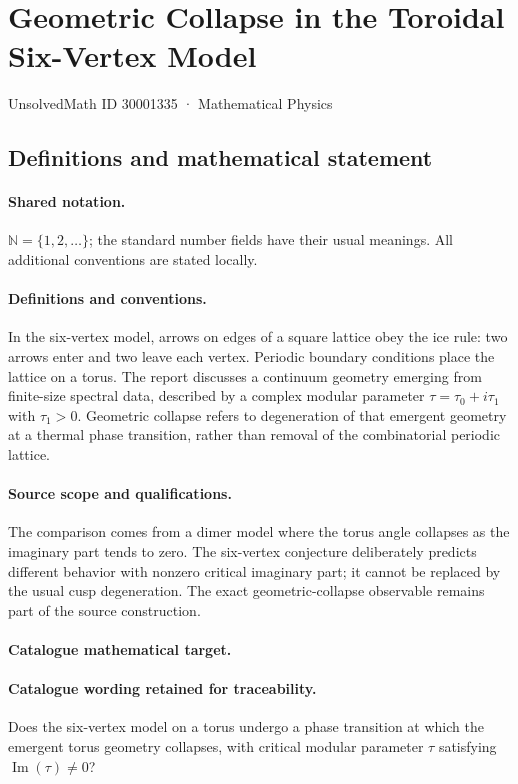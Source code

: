 \documentclass[11pt]{article}
\begin{document}
\setcounter{section}{30001334}
\section{Geometric Collapse in the Toroidal Six-Vertex Model}\label{30001335}
{\small UnsolvedMath ID 30001335 · Mathematical Physics}
\subsection{Definitions and mathematical statement}

\paragraph{Shared notation.}$\mathbb N=\{1,2,\ldots\}$; the standard number fields have their usual meanings. All additional conventions are stated locally.


\paragraph{Definitions and conventions.} In the six-vertex model, arrows on edges of a square lattice obey the ice rule: two arrows enter and two leave each vertex. Periodic boundary conditions place the lattice on a torus. The report discusses a continuum geometry emerging from finite-size spectral data, described by a complex modular parameter $\tau=\tau_0+i\tau_1$ with $\tau_1>0$. Geometric collapse refers to degeneration of that emergent geometry at a thermal phase transition, rather than removal of the combinatorial periodic lattice.

\paragraph{Source scope and qualifications.} The comparison comes from a dimer model where the torus angle collapses as the imaginary part tends to zero. The six-vertex conjecture deliberately predicts different behavior with nonzero critical imaginary part; it cannot be replaced by the usual cusp degeneration. The exact geometric-collapse observable remains part of the source construction.

\paragraph{Catalogue mathematical target.}
\paragraph{Catalogue wording retained for traceability.}
Does the six-vertex model on a torus undergo a phase transition at which the emergent torus geometry collapses, with critical modular parameter $\tau$ satisfying $\operatorname{Im}(\tau)\neq0$?
\end{document}
